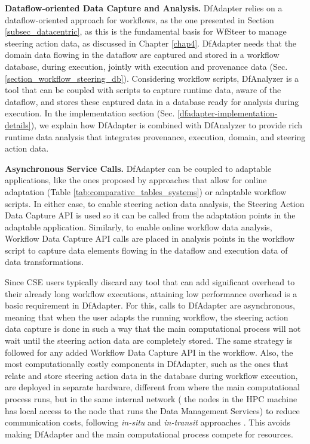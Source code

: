 \textbf{Dataflow-oriented Data Capture and Analysis.} 
DfAdapter relies on a dataflow-oriented approach for workflows, as the one presented in 
Section \ref{subsec_datacentric}, as this is the fundamental basis for WfSteer to manage steering action data, as discussed in Chapter \ref{chap4}. DfAdapter needs that the domain data flowing in the dataflow are captured and stored in a workflow database, during execution, jointly with execution and provenance data (Sec. \ref{section_workflow_steering_db}).
Considering workflow scripts, DfAnalyzer \cite{Silva2017Raw,Camata2018In,silva_dfanalyzer:_2018} is a tool that can be coupled with scripts to capture runtime data, aware of the dataflow, and stores these captured data in a database ready for analysis during execution.
In the implementation section (Sec. \ref{dfadapter-implementation-details}), we explain how DfAdapter is combined with DfAnalyzer to provide rich runtime data analysis that integrates provenance, execution, domain, and steering action data.


\textbf{Asynchronous Service Calls.}
DfAdapter can be coupled to adaptable
applications, like the ones proposed by approaches that allow for online adaptation (Table \ref{tab:comparative_tables_systems})
or adaptable workflow scripts.
In either case, to enable steering action data analysis,
the Steering Action Data Capture API is used so it can be called from the adaptation points in the adaptable application.
Similarly, to enable online workflow data analysis,
Workflow Data Capture API calls are placed in analysis points in the workflow
script to capture data elements flowing in the dataflow and execution data of data
transformations.

Since CSE users typically discard any tool that can add significant overhead to their already long workflow executions, attaining low performance overhead is a basic requirement in DfAdapter.
For this, calls to DfAdapter are asynchronous,
meaning that when the user adapts the running workflow, the steering action data capture is done in such a way that the main computational
process will not wait until the steering action data are completely stored.
The same strategy is
followed for any added Workflow Data Capture API in the workflow. Also,
the most computationally costly components in DfAdapter, such as the
ones that relate and store steering action data in the database during workflow
execution, are deployed in separate hardware, different from where the
main computational process runs, but in the same internal network
(\eg{} the nodes in the HPC machine has local access to the node that
runs the Data Management Services) to reduce communication costs,
following \textit{in-situ} and \textit{in-transit} approaches
\cite{Bauer2016In}.
This avoids making DfAdapter and the main computational process compete
for resources.

